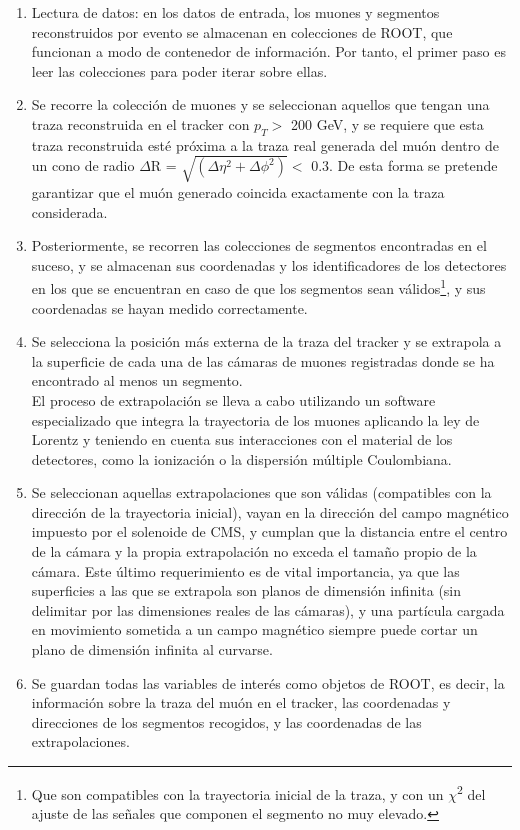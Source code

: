 \begin{enumerate}

\item Lectura de datos: en los datos de entrada, los muones y segmentos reconstruidos por evento se almacenan en colecciones de ROOT, que funcionan a modo de contenedor de informaci\'on. Por tanto, el primer paso es leer las colecciones para poder iterar sobre ellas. 

\item Se recorre la colecci\'on de muones y se seleccionan aquellos que tengan una traza reconstruida en el tracker con $p_{T} >$ 200 GeV, y se requiere que esta traza reconstruida est\'e pr\'oxima a la traza real generada del mu\'on dentro de un cono de radio $\Delta$R = $\sqrt{(\Delta\eta^{2}+\Delta\phi^{2})} <$  0.3. De esta forma se pretende garantizar que el mu\'on generado coincida exactamente con la traza considerada.

\item Posteriormente, se recorren las colecciones de segmentos encontradas en el suceso, y se almacenan sus coordenadas y los identificadores de los detectores en los que se encuentran en caso de que los segmentos sean v\'alidos\footnote{Que son compatibles con la trayectoria inicial de la traza, y con un $\chi$\textsuperscript{2} del ajuste de las se\~nales que componen el segmento no muy elevado.}, y sus coordenadas se hayan medido correctamente.

\item Se selecciona la posici\'on m\'as externa de la traza del tracker y se extrapola a la superficie de cada una de las c\'amaras de muones registradas donde se ha encontrado al menos un segmento. \\
El proceso de extrapolaci\'on se lleva a cabo utilizando un software especializado que integra la trayectoria de los muones aplicando la ley de Lorentz y teniendo en cuenta sus interacciones con el material de los detectores, como la ionizaci\'on o la dispersi\'on m\'ultiple Coulombiana.

\item Se seleccionan aquellas extrapolaciones que son v\'alidas (compatibles con la direcci\'on de la trayectoria inicial), vayan en la direcci\'on del campo magn\'etico impuesto por el solenoide de CMS, y cumplan que la distancia entre el centro de la c\'amara y la propia extrapolaci\'on no exceda el tama\~no propio de la c\'amara. Este \'ultimo requerimiento es de vital importancia, ya que las superficies a las que se extrapola son planos de dimensi\'on infinita (sin delimitar por las dimensiones reales de las c\'amaras), y una part\'icula cargada en movimiento sometida a un campo magn\'etico siempre puede cortar un plano de dimensi\'on infinita al curvarse.

\item Se guardan todas las variables de inter\'es como objetos de ROOT, es decir, la informaci\'on sobre la traza del mu\'on en el tracker, las coordenadas y direcciones de los segmentos recogidos, y las coordenadas de las extrapolaciones.
\end{enumerate}



